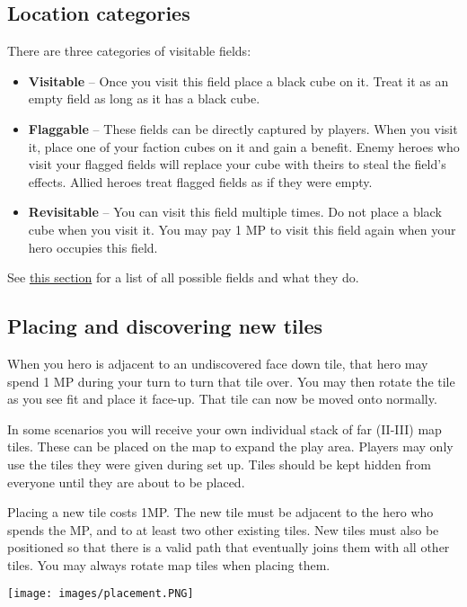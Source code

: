 \documentclass[12pt]{article}
\begin{document}
\clearpage
\subsection*{\hypertarget{Categories}{Location categories}}
There are three categories of visitable fields:
\begin{itemize}
    \item \textbf{Visitable} – Once you visit this field place a black cube on it. Treat it as an empty field as long as it has a black cube.
    \item \textbf{Flaggable} – These fields can be directly captured by players. When you visit it, place one of your faction cubes on it and gain a benefit. Enemy heroes who visit your flagged fields will replace your cube with theirs to steal the field’s effects. Allied heroes treat flagged fields as if they were empty.
    \item \textbf{Revisitable} – You can visit this field multiple times. Do not place a black cube when you visit it. You may pay 1 MP to visit this field again when your hero occupies this field.
\end{itemize}

See \hyperlink{All}{this section} for a list of all possible fields and what they do.
\subsection*{\hypertarget{Placing}{Placing and discovering new tiles}}
When you hero is adjacent to an undiscovered face down tile, that hero may spend 1 MP during your turn to turn that tile over. You may then rotate the tile as you see fit and place it face-up. That tile can now be moved onto normally.\par
In some scenarios you will receive your own individual stack of far (II-III) map tiles. These can be placed on the map to expand the play area. Players may only use the tiles they were given during set up. Tiles should be kept hidden from everyone until they are about to be placed.\par
Placing a new tile costs 1MP. The new tile must be adjacent to the hero who spends the MP, and to at least two other existing tiles. New tiles must also be positioned so that there is a valid path that eventually joins them with all other tiles. You may always rotate map tiles when placing them.\par
\begin{center}
    \texttt{[image: images/placement.PNG]}
\end{center}
\end{document}
